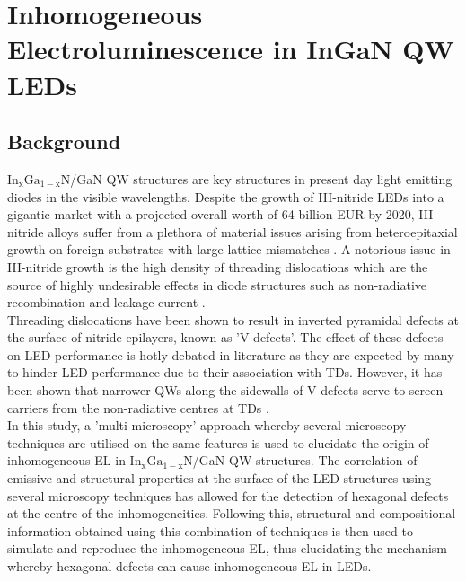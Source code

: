 
\chapter{Inhomogeneous Electroluminescence in InGaN QW LEDs}

\ifpdf
    \graphicspath{{Chapter2/Figs/Raster/}{Chapter2/Figs/PDF/}{Chapter2/Figs/}}
\else
    \graphicspath{{Chapter2/Figs/Vector/}{Chapter2/Figs/}}
\fi


\section[Short title]{Background}


$\mathrm{In_{x}Ga_{1-x}N}$/GaN QW structures are key structures in present day light emitting diodes in the visible wavelengths. Despite the growth of III-nitride LEDs into a gigantic market with a projected overall worth of 64 billion EUR by 2020, III-nitride alloys suffer from a plethora of material issues arising from heteroepitaxial growth on foreign substrates with large lattice mismatches \cite{Bennett2010b}. A notorious issue in III-nitride growth is the high density of threading dislocations which are the source of highly undesirable effects in diode structures such as non-radiative recombination \cite{Albrecht2008} and leakage current \cite{Bennett2010b}.\\
Threading dislocations have been shown to result in inverted pyramidal defects at the surface of nitride epilayers, known as 'V defects'. The effect of these defects on LED performance is hotly debated in literature as they are expected by many to hinder LED performance due to their association with TDs. However, it has been shown that narrower QWs along the sidewalls of V-defects serve to screen carriers from the non-radiative centres at TDs \cite{Hangleiter2005}.\\
In this study, a 'multi-microscopy' approach whereby several microscopy techniques are utilised on the same features is used to elucidate the origin of inhomogeneous EL in $\mathrm{In_{x}Ga_{1-x}N}$/GaN QW structures. The correlation of emissive and structural properties at the surface of the LED structures using several microscopy techniques has allowed for the detection of hexagonal defects at the centre of the inhomogeneities. Following this, structural and compositional information obtained using this combination of techniques is then used to simulate and reproduce the inhomogeneous EL, thus elucidating the mechanism whereby hexagonal defects can cause inhomogeneous EL in LEDs.


